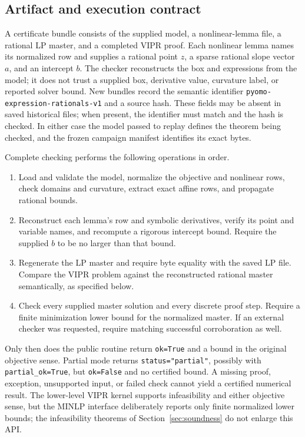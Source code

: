\subsection{Artifact and execution contract}
\label{sec:artifact-contract}
A certificate bundle consists of the supplied model, a nonlinear-lemma file, a rational LP master, and a completed VIPR proof. Each nonlinear lemma names its normalized row and supplies a rational point $z$, a sparse rational slope vector $a$, and an intercept $b$. The checker reconstructs the box and expressions from the model; it does not trust a supplied box, derivative value, curvature label, or reported solver bound. New bundles record the semantic identifier \texttt{pyomo-expression-rationals-v1} and a source hash. These fields may be absent in saved historical files; when present, the identifier must match and the hash is checked. In either case the model passed to replay defines the theorem being checked, and the frozen campaign manifest identifies its exact bytes.

Complete checking performs the following operations in order.
\begin{enumerate}
\item Load and validate the model, normalize the objective and nonlinear rows, check domains and curvature, extract exact affine rows, and propagate rational bounds.
\item Reconstruct each lemma's row and symbolic derivatives, verify its point and variable names, and recompute a rigorous intercept bound. Require the supplied $b$ to be no larger than that bound.
\item Regenerate the LP master and require byte equality with the saved LP file. Compare the VIPR problem against the reconstructed rational master semantically, as specified below.
\item Check every supplied master solution and every discrete proof step. Require a finite minimization lower bound for the normalized master. If an external checker was requested, require matching successful corroboration as well.
\end{enumerate}
Only then does the public routine return \texttt{ok=True} and a bound in the original objective sense. Partial mode returns \texttt{status="partial"}, possibly with \texttt{partial\_ok=True}, but \texttt{ok=False} and no certified bound. A missing proof, exception, unsupported input, or failed check cannot yield a certified numerical result. The lower-level VIPR kernel supports infeasibility and either objective sense, but the MINLP interface deliberately reports only finite normalized lower bounds; the infeasibility theorems of Section~\ref{sec:soundness} do not enlarge this API.

